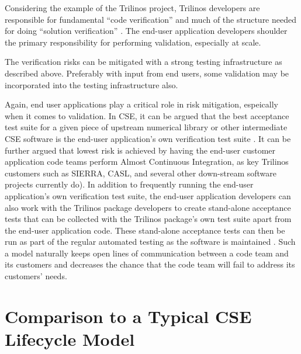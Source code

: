 \documentclass[11pt]{SANDreport}
\begin{document}
Considering the example of the Trilinos project, Trilinos developers are
responsible for fundamental ``code verification'' and much of the
structure needed for doing ``solution verification''
{}\cite{SEVVIntersections05}.  The end-user application
developers shoulder the primary responsibility for performing validation,
especially at scale.

The verification risks can be mitigated with a strong testing
infrastructure as described above.  Preferably with input from end users, some
validation may be incorporated into the testing infrastructure also.

Again, end user applications play a critical role in risk mitigation,
espeically when it comes to validation.  In CSE, it can be
argued that the best acceptance test suite for a given piece of
upstream numerical library or other intermediate CSE software is the
end-user application's own verification test suite
{}\cite{SoftwareIntegrationforCSE09}.  It can be further argued that
lowest risk is achieved by having the end-user customer application
code teams perform Almost Continuous Integration, as key Trilinos customers
such as SIERRA, CASL, and several other down-stream software projects
currently do{}\cite{SoftwareIntegrationforCSE09}).  In addition
to frequently running the end-user application's own verification test
suite, the end-user application developers can also work with the
Trilinos package developers to create stand-alone acceptance tests
that can be collected with the Trilinos package's own test suite apart
from the end-user application code.  These stand-alone acceptance
tests can then be run as part of the regular automated testing as the
software is maintained {}\cite{DomainDrivenDesign}.  Such a model naturally
keeps open lines of communication between a code team and its customers and
decreases the chance that the code team will fail to address its customers'
needs.

%
\section{Comparison to a Typical CSE Lifecycle Model}
\label{sec:compare_with_typical_CSE_model}
%
\end{document}
